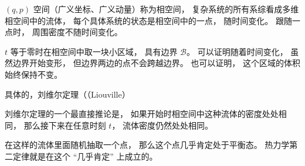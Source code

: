 
\begin{issues}
\issueDraft
\end{issues}

$(q, p)$ 空间（广义坐标、广义动量）称为相空间， 复杂系统的所有系综看成多维相空间中的流体， 每个具体系统的状态是相空间中的一点， 随时间变化。 跟随一点时， 周围密度不随时间变化。

$t$ 等于零时在相空间中取一块小区域， 具有边界 $\mathcal B$。 可以证明随着时间变化， 虽然边界开始变形， 但边界两边的点不会跨越边界。 也可以证明， 这个区域的体积始终保持不变。

具体的，刘维尔定理（（Liouville）

刘维尔定理的一个最直接推论是， 如果开始时相空间中这种流体的密度处处相同， 那么接下来在任意时刻 $t$， 流体密度仍然处处相同。

在这样的流体里面随机抽取一个点， 那么这个点几乎肯定处于平衡态。 热力学第二定律就是在这个 “几乎肯定” 上成立的。

